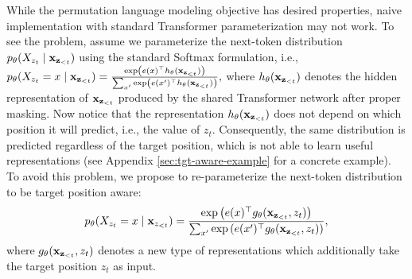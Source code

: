 \label{sec:tgt-aware}
While the permutation language modeling objective has desired properties, naive implementation with standard Transformer parameterization may not work.
To see the problem, assume we parameterize the next-token distribution $p_\theta(X_{z_t} \mid {\mathbf{x}}_{{\mathbf{z}}_{<t}})$ using the standard Softmax formulation, i.e.,
$
p_\theta(X_{z_t} = x \mid {\mathbf{x}}_{{\mathbf{z}}_{<t}})
= \frac{\exp \left( { e(x)^\top h_\theta({\mathbf{x}}_{{\mathbf{z}}_{<t}}) } \right)}{\sum_{x'} \exp \left( { e(x')^\top h_\theta({\mathbf{x}}_{{\mathbf{z}}_{<t}}) } \right)},
$
where $h_\theta({\mathbf{x}}_{{\mathbf{z}}_{<t}})$ denotes the hidden representation of ${\mathbf{x}}_{{\mathbf{z}}_{<t}}$ produced by the shared Transformer network after proper masking.
Now notice that the representation $h_\theta({\mathbf{x}}_{{\mathbf{z}}_{<t}})$ does not depend on which position it will predict, i.e., the value of $z_t$.
Consequently, the same distribution is predicted regardless of the target position,
which is not able to learn useful representations (see Appendix \ref{sec:tgt-aware-example} for a concrete example).
To avoid this problem, we propose to re-parameterize the next-token distribution to be target position aware:
\begin{equation}
\label{eqn:tgt-aware}
p_\theta(X_{z_t} = x \mid {\mathbf{x}}_{z_{<t}})
= \frac{\exp \left( { e(x)^\top g_\theta({\mathbf{x}}_{{\mathbf{z}}_{<t}}, z_t) } \right)}{\sum_{x'} \exp \left( { e(x')^\top g_\theta({\mathbf{x}}_{{\mathbf{z}}_{<t}}, z_t) } \right)},
\end{equation}
where $g_\theta({\mathbf{x}}_{{\mathbf{z}}_{<t}}, z_t)$ denotes a new type of representations which additionally take the target position $z_t$ as input. 

